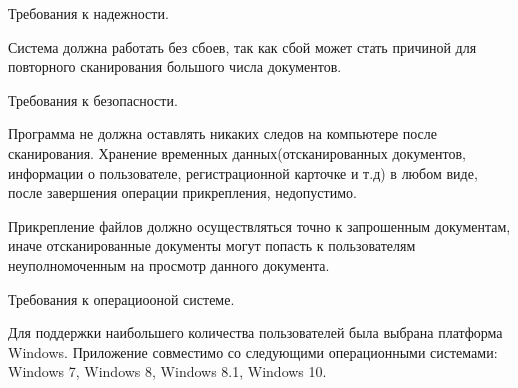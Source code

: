   \item[5] Требования к надежности.

\hspace*{2.5em}Система должна работать без сбоев, так как сбой может стать причиной для повторного сканирования большого числа документов.

  \item[6] Требования к безопасности.

\hspace*{2.5em}Программа не должна оставлять никаких следов на компьютере после сканирования. Хранение временных данных(отсканированных документов, информации о пользователе, регистрационной карточке и т.д) в любом виде, после завершения операции прикрепления, недопустимо.

\hspace*{2.5em}Прикрепление файлов должно осуществляться точно к запрошенным документам, иначе отсканированные документы  могут попасть к пользователям неуполномоченным на просмотр данного документа.
  
  \item[7] Требования к операциооной системе.

\hspace*{2.5em}Для поддержки наибольшего количества пользователей была выбрана платформа Windows. Приложение совместимо со следующими операционными системами: Windows 7, Windows 8, Windows 8.1, Windows 10.